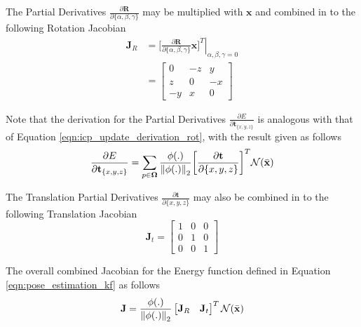 The Partial Derivatives
$\frac{\partial \mathbf{R}}{\partial \{\alpha, \beta, \gamma\}}$ may be
multiplied with $\mathbf{x}$ and combined in to the following Rotation Jacobian
\begin{equation}
  \label{eqn:rot_jac}
  \begin{split}
    \mathbf{J}_{R} & = \left. \bigg[
      \frac{\partial \mathbf{R}}{\partial \{\alpha, \beta, \gamma\}} \mathbf{x}
      \bigg]^{T} \right\vert_{\alpha,\beta,\gamma = 0} \\
    & =
    \begin{bmatrix}
      0 & -z & y \\
      z & 0 & -x \\
      -y & x & 0
    \end{bmatrix}
  \end{split}
\end{equation}

Note that the derivation for the Partial Derivatives
$\frac{\partial E}{\partial \mathbf{t}_{\{x, y, z\}}}$ is analogous with that of
Equation \ref{eqn:icp_update_derivation_rot}, with the result given as follows
\begin{equation}
  \label{eqn:icp_update_derivation_trans}
  \frac{\partial E}{\partial \mathbf{t}_{\{x, y, z\}}} =
  \sum_{p \in \mathbf{\Omega}}
  \frac{\phi(.)}{\left\lVert\phi(.)\right\rVert_{2}}
  \bigg[ \frac{\partial \mathbf{t}}{\partial \{x, y, z\}}\bigg]^{T}
  \mathcal{N}(\bar{\mathbf{x}})
\end{equation}

The Translation Partial Derivatives
$\frac{\partial \mathbf{t}}{\partial \{x, y, z\}}$ may also be combined in to
the following Translation Jacobian
\begin{equation}
  \label{eqn:trans_jac}
  \mathbf{J}_{t} =
  \begin{bmatrix}
    1 & 0 & 0 \\
    0 & 1 & 0 \\
    0 & 0 & 1
  \end{bmatrix}
\end{equation}

The overall combined Jacobian for the Energy function defined in Equation
\ref{eqn:pose_estimation_kf} as follows
\begin{equation}
  \label{eqn:pose_jacobian}
  \mathbf{J} =
  \frac{\phi(.)}{\left\lVert\phi(.)\right\rVert_{2}}
  \begin{bmatrix}
    \mathbf{J}_{R} & \mathbf{J}_{t}
  \end{bmatrix}^{T}
  \mathcal{N}(\bar{\mathbf{x}})
\end{equation}


